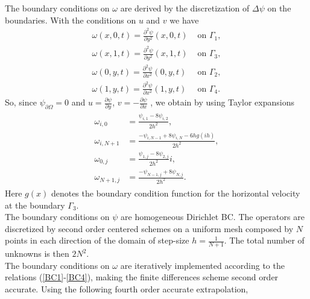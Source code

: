 \documentclass[11pt]{article}
\newcommand{\Frac}[2] {\frac{\textstyle #1} {\textstyle #2}}
\begin{document}
{The boundary conditions on $\omega$ are derived by the
discretization of $\Delta \psi$ on the boundaries. With the
conditions on $u$ and $v$ we have
$$
\begin{array}{ll}
\omega(x,0,t) = \Frac {\partial^2 \psi}{\partial y^2}(x,0,t) &
\mbox{ on } \Gamma_1,\\
\omega(x,1,t) = \Frac {\partial^2 \psi}{\partial y^2}(x,1,t) &
\mbox{ on } \Gamma_3,\\
\omega(0,y,t) = \Frac {\partial^2 \psi}{\partial x^2}(0,y,t) &
\mbox{ on } \Gamma_2,\\
\omega(1,y,t) = \Frac {\partial^2 \psi}{\partial x^2}(1,y,t) &
\mbox{ on } \Gamma_4.
\end{array}
$$
So, since $\psi_{\partial \Omega}=0$ and $u=\Frac {\partial
\psi}{\partial y}$, $v=-\Frac {\partial \psi}{\partial x}$ , we
obtain by using Taylor expansions
\begin{eqnarray}
\begin{array}{ll}
\omega_{i,0} &=
\Frac { \psi_{i,1}-8\psi_{i,2}}{2h^2}\label{BC1},\\
\omega_{i,N+1} &= \Frac {- \psi_{i,N-1}+8\psi_{i,N} -6h
g(ih)}{2h^2}\label{BC2},\\
\omega_{0,j} &=
\Frac {\psi_{1,j}-8\psi_{2,j}}{2h^2}i\label{BC3},\\
\omega_{N+1,j} &= \Frac {-
\psi_{N-1,j}+8\psi_{N,j}}{2h^2}\label{BC4}.
\end{array}
\end{eqnarray}
Here $g(x)$ denotes the boundary condition function for the
horizontal velocity
at the boundary $\Gamma_3$.\\
The boundary conditions on $\psi$ are homogeneous Dirichlet BC. The
operators are discretized by second order centered schemes on a
uniform mesh composed by $N$ points in each direction of the domain
of step-size
$h=\Frac{1}{N+1}$. The total number of unknowns is then $2 N^2$.\\
The boundary conditions on $\omega$ are iteratively implemented
according to the relations (\ref{BC1}-\ref{BC4}), making the finite
differences scheme second order accurate. Using the following fourth order accurate extrapolation,

}
\end{document}
